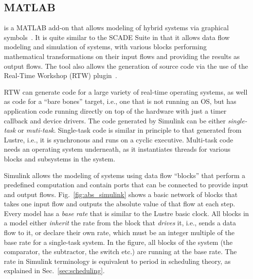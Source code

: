 \subsection{MATLAB \simu}
\simu is a MATLAB add-on that allows modeling of hybrid systems via
graphical symbols~\cite{simulink}. It is quite similar to the SCADE
Suite in that it allows data flow modeling and simulation of systems,
with various blocks performing mathematical transformations on their
input flows and providing the results as output flows. The tool also
allows the generation of source code via the use of the Real-Time
Workshop (RTW) plugin~\cite{rtw}.

RTW can generate code for a large variety of real-time operating
systems, as well as code for a ``bare bones'' target, i.e., one that
is not running an OS, but has application code running directly on top
of the hardware with just a timer callback and device drivers. The
code generated by Simulink can be either \emph{single-task} or
\emph{muti-task}. Single-task code is similar in principle to that
generated from Lustre, i.e., it is synchronous and runs on a cyclic
executive. Multi-task code needs an operating system underneath, as it
instantiates threads for various blocks and subsystems in the system.

Simulink allows the modeling of systems using data flow ``blocks''
that perform a predefined computation and contain ports that can be
connected to provide input and output
flows. Fig.~\ref{fig:abs_simulink} shows a basic network of blocks
that takes one input flow and outputs the absolute value of that flow
at each step. Every model has a \emph{base rate} that is similar to
the Lustre basic clock. All blocks in a model either \emph{inherit}
the rate from the block that \emph{drives} it, i.e., sends a data flow
to it, or declare their own rate, which must be an integer multiple of
the base rate for a single-task system. In the figure, all blocks of
the system (the comparator, the subtractor, the switch etc.) are
running at the base rate. The rate in Simulink terminology is
equivalent to period in scheduling theory, as explained in
Sec.~\ref{sec:scheduling}.


